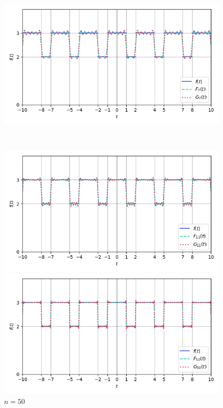 \documentclass[a4paper]{article}
\begin{document}
\begin{figure}[H]
\begin{minipage}{0.5\textwidth}
        \caption{$n = 4$}
    \end{minipage}\hfill
    \begin{minipage}{0.5\textwidth}
        \centering \includegraphics[width=\textwidth]{square_wave/7.png}
        \caption{$n = 7$}
    \end{minipage}\\[1em]
    \begin{minipage}{0.5\textwidth}
        \centering \includegraphics[width=\textwidth]{square_wave/11.png}
        \caption{$n = 11$}
    \end{minipage}
    \begin{minipage}{0.5\textwidth}
        \centering \includegraphics[width=\textwidth]{square_wave/50.png}
        \caption{$n = 50$}
    \end{minipage}
\end{figure}\noindent
\end{document}
